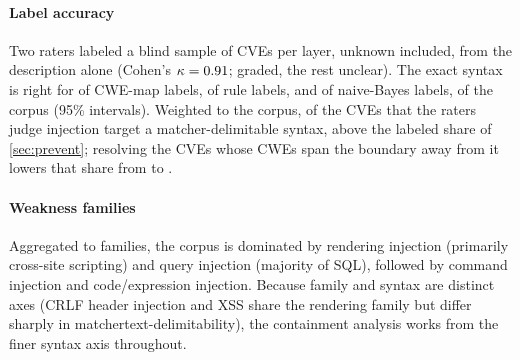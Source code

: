 \paragraph{Label accuracy}
Two raters labeled a blind sample of \dataAuditPerMethod CVEs per layer,
unknown included, from the description alone (Cohen's
$\kappa=0.91$; \dataAuditGraded graded, the rest unclear).
The exact syntax is right for \dataAuditPrecisionCwe of CWE-map labels,
\dataAuditPrecisionRule of rule labels, and \dataAuditPrecisionNb of naive-Bayes
labels, \dataMethodNbShare of the corpus (95\% intervals).
Weighted to the corpus, \dataAuditHostableShare of the CVEs that the raters judge
injection target a matcher-delimitable syntax, above the labeled share of
\cref{sec:prevent}; resolving the \dataLabelConflictCVEs CVEs whose CWEs span the boundary away from
it lowers that share from \dataHostableShareExact to \dataHostableLowShare.

\paragraph{Weakness families}
Aggregated to families, the corpus is dominated by rendering injection
(primarily cross-site scripting) and query injection (majority of SQL),
followed by command injection and code/expression injection.
Because family and syntax are distinct axes (CRLF header injection and XSS
share the rendering family but differ sharply in matchertext-delimitability), the
containment analysis works from the finer syntax axis throughout.
